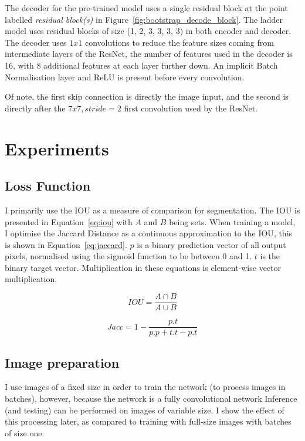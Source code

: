 The decoder for the pre-trained model uses a single residual block at the point labelled \emph{residual block(s)} in Figure~\ref{fig:bootstrap_decode_block}. The ladder model uses residual blocks of size (1, 2, 3, 3, 3, 3) in both encoder and decoder. The decoder uses $ 1x1 $ convolutions to reduce the feature sizes coming from intermediate layers of the ResNet, the number of features used in the decoder is 16, with 8 additional features at each layer further down. An implicit Batch Normalisation layer and ReLU is present before every convolution.

Of note, the first skip connection is directly the image input, and the second is directly after the $7x7, stride=2$ first convolution used by the ResNet.


\section {Experiments}


\subsection {Loss Function}


I primarily use the \gls{IOU} as a measure of comparison for segmentation. The \gls{IOU} is presented in Equation~\ref{eq:iou} with $ A $ and $ B $ being sets. When training a model, I optimise the Jaccard Distance as a continuous approximation to the \gls{IOU}, this is shown in Equation~\ref{eq:jaccard}.  $ p $ is a binary prediction vector of all output pixels, normalised using the sigmoid function to be between 0 and 1. $ t $ is the binary target vector. Multiplication in these equations is element-wise vector multiplication.


\begin{equation}
IOU = \frac{A \cap B}{A \cup B}
\label{eq:iou}
\end{equation}


\begin{equation}
Jacc = 1 - \frac{p.t}{p.p + t.t - p.t}
\label{eq:jaccard}
\end{equation}



\subsection {Image preparation}

I use images of a fixed size in order to train the network (to process images in batches), however, because the network is a fully convolutional network Inference (and testing) can be performed on images of variable size. I show the effect of this processing later, as compared to training with full-size images with batches of size one.

